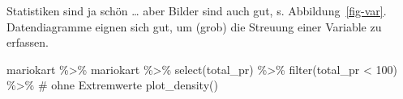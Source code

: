 \documentclass[
  letterpaper,
]{scrbook}
\newenvironment{Shaded}{\begin{snugshade}}{\end{snugshade}}
\newcommand{\CommentTok}[1]{\textcolor[rgb]{0.37,0.37,0.37}{#1}}
\newcommand{\DecValTok}[1]{\textcolor[rgb]{0.68,0.00,0.00}{#1}}
\newcommand{\FunctionTok}[1]{\textcolor[rgb]{0.28,0.35,0.67}{#1}}
\newcommand{\NormalTok}[1]{\textcolor[rgb]{0.00,0.23,0.31}{#1}}
\newcommand{\SpecialCharTok}[1]{\textcolor[rgb]{0.37,0.37,0.37}{#1}}
\theoremstyle{definition}
\theoremstyle{definition}
\theoremstyle{definition}
\theoremstyle{remark}
\begin{document}
Statistiken sind ja schön \ldots{} aber Bilder sind auch gut, s.
Abbildung~\ref{fig-var}. Datendiagramme eignen sich gut, um (grob) die
Streuung einer Variable zu erfassen.

\begin{Shaded}
\begin{Highlighting}[]
\NormalTok{mariokart }\SpecialCharTok{\%\textgreater{}\%} 
\NormalTok{  mariokart }\SpecialCharTok{\%\textgreater{}\%} 
  \FunctionTok{select}\NormalTok{(total\_pr) }\SpecialCharTok{\%\textgreater{}\%} 
  \FunctionTok{filter}\NormalTok{(total\_pr }\SpecialCharTok{\textless{}} \DecValTok{100}\NormalTok{) }\SpecialCharTok{\%\textgreater{}\%}  \CommentTok{\# ohne Extremwerte}
  \FunctionTok{plot\_density}\NormalTok{()}
\end{Highlighting}
\end{Shaded}
\end{document}
